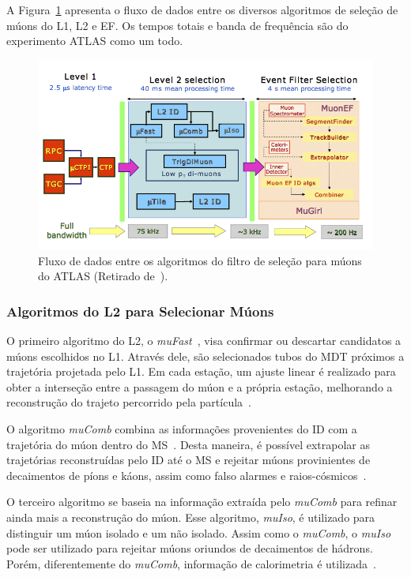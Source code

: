 A Figura~\ref{fig:MUONHLTFLOW} apresenta o fluxo de dados entre os diversos algoritmos de
seleção de múons do L1, L2 e EF. Os tempos totais e banda de frequência são do
experimento ATLAS como um todo.

\begin{figure}[htpb!]
    \centering
    \includegraphics[width=\textwidth]{images/hlt_flow_muon.png}
    \caption[ Fluxo de dados entre os algoritmos do filtro de seleção para múons
    do ATLAS] {Fluxo de dados entre os algoritmos do filtro de seleção para
        múons do ATLAS (Retirado de~\cite{VENTURA2010}).}
    \label{fig:MUONHLTFLOW}
\end{figure}

\subsubsection{Algoritmos do L2 para Selecionar Múons}

O primeiro algoritmo do L2, o \emph{muFast}~\cite{DIMATTIA2003}, visa confirmar
ou descartar candidatos a múons escolhidos no L1. Através dele, são selecionados
tubos do MDT próximos a trajetória projetada pelo L1. Em cada estação, um ajuste
linear é realizado para obter a interseção entre a passagem do múon e a própria
estação, melhorando a reconstrução do trajeto percorrido pela
partícula~\cite{DIMATTIA2011}.

O algoritmo \emph{muComb} combina as informações provenientes do ID com a
trajetória do múon dentro do MS~\cite{VENTURA2010}. Desta maneira, é possível
extrapolar as trajetórias reconstruídas pelo ID até o MS e rejeitar múons
provinientes de decaimentos de píons e káons, assim como falso alarmes e
raios-cósmicos~\cite{COSMICRAY2010}.


O terceiro algoritmo se baseia na informação extraída pelo \emph{muComb} para
refinar ainda mais a reconstrução do múon. Esse algoritmo, \emph{muIso}, é
utilizado para distinguir um múon isolado e um não isolado. Assim como o
\emph{muComb}, o \emph{muIso} pode ser utilizado para rejeitar múons oriundos de decaimentos
de hádrons. Porém, diferentemente do \emph{muComb}, informação de calorimetria é
utilizada~\cite{VENTURA2010}.


